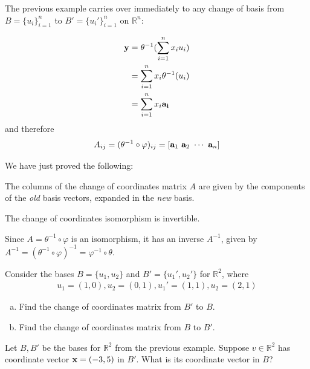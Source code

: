 \documentclass[12pt,letterpaper,reqno]{article}
\numberwithin{equation}{section}
\newcommand{\ti}[1]{\textit{#1}}
\begin{document}
The previous example carries over immediately to any change of basis from $B=\{u_i\}_{i=1}^n$ to $B'=\{u_i'\}_{i=1}^n$ on $\mathbb{R}^n$:

\begin{align*}
	{\bf y}&=\theta^{-1}(\sum_{i=1}^nx_iu_i) \\
		   &=\sum_{i=1}^nx_i\theta^{-1}(u_i) \\
		   &=\sum_{i=1}^nx_i{\bf a_i}
\end{align*}
and therefore
\begin{equation}\label{eq:change_of_basis_matrix_for_r_n}
	A_{ij}=(\theta^{-1}\circ \varphi)_{ij}=[{\bf a}_1 \ {\bf a}_2 \ \cdots \ {\bf a}_n]
\end{equation}

We have just proved the following:

\begin{prop}
	The columns of the change of coordinates matrix $A$ are given by the components of the \ti{old} basis vectors, expanded in the \ti{new} basis.
\end{prop}

\begin{thm}[$A$ is invertible]
	The change of coordinates isomorphism is invertible.
\end{thm}

\begin{pf}
Since $A=\theta^{-1}\circ \varphi$ is an isomorphism, it has an inverse $A^{-1}$, given by $A^{-1}=(\theta^{-1}\circ \varphi)^{-1}=\varphi^{-1} \circ \theta$.
\end{pf}

\begin{exercise}
Consider the bases $B=\{u_1,u_2\}$ and $B'=\{u_1',u_2'\}$ for $\mathbb{R}^2$, where
\begin{align*}
	u_1=(1,0), u_2=(0,1), u_1'=(1,1), u_2=(2,1)
\end{align*} 	
\begin{enumerate}[(a)]
	\item Find the change of coordinates matrix from $B'$ to $B$.
	\item Find the change of coordinates matrix from $B$ to $B'$.
\end{enumerate}
\end{exercise}

\begin{exercise}
Let $B,B'$ be the bases for $\mathbb{R}^2$ from the previous example. Suppose $v \in \mathbb{R}^2$ has coordinate vector ${\bf x}=(-3,5)$ in $B'$. What is its coordinate vector in $B$?	
\end{exercise}
\end{document}
